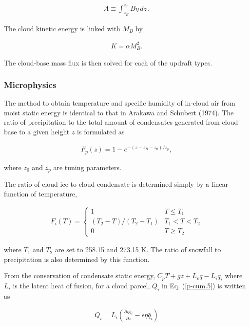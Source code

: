 \begin{eqnarray}
 A \equiv \int_{z_B}^{z_T} B \eta \,dz\,.
\end{eqnarray}

The cloud kinetic energy is linked with \(M_B\) by

\begin{eqnarray}
 K = \alpha M_B^2.  \label{p-cum.9}
\end{eqnarray}

The cloud-base mass flux is then solved for each of the updraft types.

\hypertarget{microphysics}{%
\subsubsection{Microphysics}\label{microphysics}}

The method to obtain temperature and specific humidity of in-cloud air from moist static energy is identical to that in Arakawa and Schubert (1974). The ratio of precipitation to the total amount of
condensates generated from cloud base to a given height \(z\) is formulated as

\begin{eqnarray}
 F_p(z) = 1 - e^{-(z - z_B - z_0)/z_p},
\end{eqnarray}

where \(z_0\) and \(z_p\) are tuning parameters.

The ratio of cloud ice to cloud condensate is determined simply by a linear function of temperature,

\begin{eqnarray}
 F_i(T) = \begin{cases} 1 & T \leq T_1 \\ (T_2 - T)/(T_2 - T_1) & T_1 < T < T_2 \\ 0  & T \geq T_2 \end{cases}
\end{eqnarray}

where \(T_1\) and \(T_2\) are set to 258.15 and 273.15 K. The ratio of snowfall to precipitation is also determined by this function.

From the conservation of condensate static energy, \(C_p T + gz + L_v q - L_i q_i\) where \(L_i\) is the latent heat of fusion, for a cloud parcel, \(Q_i\) in Eq. (\ref{p-cum.5}) is written as

\begin{eqnarray}
 Q_i = L_i \left(\frac{\partial \eta \hat{q}_i}{\partial z} - \epsilon\eta\bar{q}_i\right)
\end{eqnarray}

